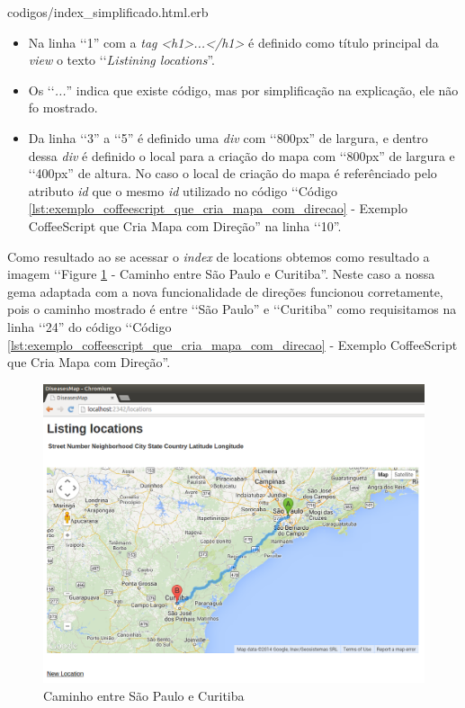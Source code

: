 
{codigos/index_simplificado.html.erb}

\begin{itemize}

 \item Na linha ‘‘1'' com a \emph{tag} \emph{<h1>...</h1>} é definido como título principal da \emph{view} o
 texto ‘‘\emph{Listining locations}''.
 
 \item Os ‘‘\emph{...}'' indica que existe código, mas por simplificação na explicação, ele não fo mostrado.
 
 \item Da linha ‘‘3'' a ‘‘5'' é definido uma \emph{div} com ‘‘800px'' de largura, e dentro dessa \emph{div}
 é definido o local para a criação do mapa com ‘‘800px'' de largura e ‘‘400px'' de altura. No caso o local 
 de criação do mapa é referênciado pelo atributo \emph{id} que o mesmo \emph{id} utilizado no código 
 ‘‘Código \ref{lst:exemplo_coffeescript_que_cria_mapa_com_direcao} - Exemplo CoffeeScript que Cria Mapa com 
 Direção'' na linha ‘‘10''.  
 
\end{itemize}

Como resultado ao se acessar o \emph{index} de locations obtemos como resultado a imagem ‘‘Figure 
\ref{fig:caminho_entre_sao_paulo_e_curitiba} - Caminho entre São Paulo e Curitiba''. Neste caso a
nossa gema adaptada com a nova funcionalidade de direções funcionou corretamente, pois o caminho
mostrado é entre ‘‘São Paulo'' e ‘‘Curitiba'' como requisitamos na linha ‘‘24'' do código ‘‘Código 
\ref{lst:exemplo_coffeescript_que_cria_mapa_com_direcao} - Exemplo CoffeeScript que Cria Mapa com Direção''.

 \begin{figure}[ht]
  \includegraphics[scale=0.44]{images/caminho_entre_sao_paulo_e_curitiba.png}
  \caption{Caminho entre São Paulo e Curitiba}
  \label{fig:caminho_entre_sao_paulo_e_curitiba}
\end{figure}